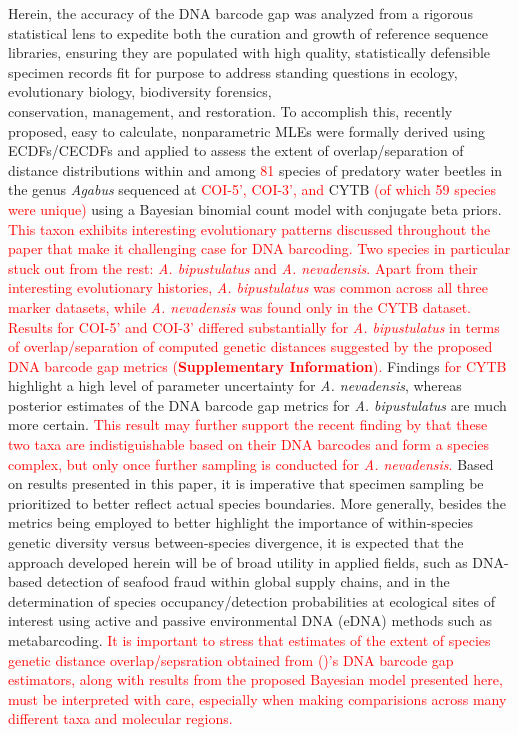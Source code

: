 \documentclass[12pt]{article}
\begin{document}
Herein, the accuracy of the DNA barcode gap was analyzed from a rigorous statistical lens to expedite both the curation and growth of reference sequence libraries, ensuring they are populated with high quality, statistically defensible specimen records fit for purpose to address standing questions in ecology, evolutionary biology, biodiversity forensics, \\ conservation, management, and restoration. To accomplish this, recently proposed, easy to calculate, nonparametric MLEs were formally derived using ECDFs/CECDFs and applied to assess the extent of overlap/separation of distance distributions within and among \textcolor{red}{81} species of predatory water beetles in the genus \textit{Agabus} sequenced at \textcolor{red}{COI-5', COI-3', and} CYTB \textcolor{red}{(of which 59 species were unique)} using a Bayesian binomial count model with conjugate beta priors. \textcolor{red}{This taxon exhibits interesting evolutionary patterns discussed throughout the paper that make it challenging case for DNA barcoding. Two species in particular stuck out from the rest: \textit{A. bipustulatus} and \textit{A. nevadensis}. Apart from their interesting evolutionary histories, \textit{A. bipustulatus} was common across all three marker datasets, while \textit{A. nevadensis} was found only in the CYTB dataset. Results for COI-5' and COI-3' differed substantially for \textit{A. bipustulatus} in terms of overlap/separation of computed genetic distances suggested by the proposed DNA barcode gap metrics (\textbf{Supplementary Information}).} Findings \textcolor{red}{for CYTB} highlight a high level of parameter uncertainty for \textit{A. nevadensis}, whereas posterior estimates of the DNA barcode gap metrics for \textit{A. bipustulatus} are much more certain. \textcolor{red}{This result may further support the recent finding by \citet{pallares2024genomic} that these two taxa are indistiguishable based on their DNA barcodes and form a species complex, but only once further sampling is conducted for \textit{A. nevadensis}.} Based on results presented in this paper, it is imperative that specimen sampling be prioritized to better reflect actual species boundaries. More generally, besides the metrics being employed to better highlight the importance of within-species genetic diversity versus between-species divergence, it is expected that the approach developed herein will be of broad utility in applied fields, such as DNA-based detection of seafood fraud within global supply chains, and in the determination of species occupancy/detection probabilities at ecological sites of interest using active and passive environmental DNA (eDNA) methods such as metabarcoding. \textcolor{red}{It is important to stress that estimates of the extent of species genetic distance overlap/sepsration obtained from \citeauthor{phillips2024measure} (\citeyear{phillips2024measure})'s DNA barcode gap estimators, along with results from the proposed Bayesian model presented here, must be interpreted with care, especially when making comparisions across many different taxa and molecular regions.}
\end{document}
